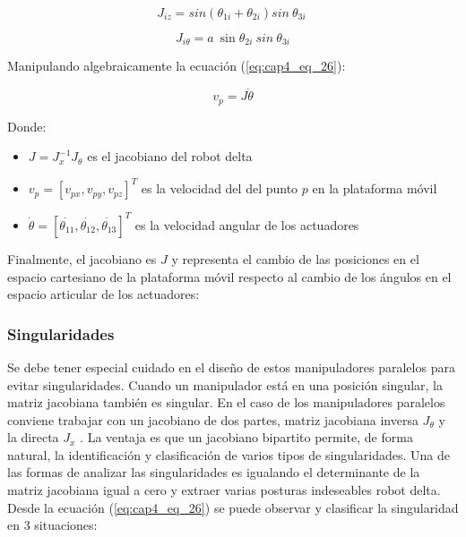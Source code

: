     \begin{equation}
          J_{iz}=sin \left(  \theta _{1i}+ \theta _{2i} \right) sin~ \theta _{3i}~  
          \label{eq:cap4_eq_30}
    \end{equation}
    \vspace{-3.5em}

    \begin{equation}
         J_{i \theta }=a~\sin  \theta _{2i}~sin~ \theta _{3i}
         \label{eq:cap4_eq_31}
    \end{equation}
         \vspace{-1em}
   
    Manipulando algebraicamente la ecuación (\ref{eq:cap4_eq_26}):
    
     \begin{equation}
        v_{p}=J\dot{ \theta }
        \label{eq:cap4_eq_32}
    \end{equation}   
    
         Donde: 

        \begin{itemize}
            \item {$J=J_{x}^{-1}J_{ \theta }$  es el jacobiano del robot delta
}
            \item {$v_{p}= \left[ v_{px},v_{py},v_{pz} \right] ^{T}$ es la velocidad del del punto  $p$ en la plataforma móvil
}
            \item {$\dot{ \theta }= \left[ \dot{ \theta _{11}},\dot{ \theta _{12}},\dot{ \theta _{13}}  \right] ^{T}$  es la velocidad angular de los actuadores
}
        \end{itemize}

    Finalmente, el jacobiano es $J$ y representa el cambio de las posiciones en el espacio cartesiano de la plataforma móvil respecto al cambio de los ángulos en el espacio articular de los actuadores:
        


        
        \newpage

        
        \subsubsection{Singularidades}\label{CAP4_SINGULARIDAD}
        
        Se debe tener especial cuidado en el diseño de estos manipuladores paralelos para evitar singularidades. Cuando un manipulador está en una posición singular, la matriz jacobiana también es singular. En el caso de los manipuladores paralelos conviene trabajar con un jacobiano de dos partes, matriz jacobiana inversa   $J_{ \theta }$  y la directa  $ J_{x} $ . La ventaja es que un jacobiano bipartito permite, de forma natural, la identificación y clasificación de varios tipos de singularidades. Una de las formas de analizar las singularidades es igualando el determinante de la matriz jacobiana igual a cero y extraer varias posturas indeseables robot delta. Desde la ecuación  (\ref{eq:cap4_eq_26}) se puede observar y clasificar la singularidad en 3 situaciones:
        
